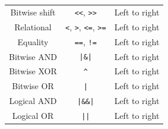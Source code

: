 \documentclass[a4paper]{report}
\begin{document}
\begin{table}[H]
\begin{tabular}{c c c}
        Bitwise shift                 & \texttt{<<}, \texttt{>>}                                                                                                                                                                                    & Left to right                  \\
        Relational                    & \texttt{<}, \texttt{>}, \texttt{<=}, \texttt{>=}                                                                                                                                              & Left to right                  \\
        Equality                      & \texttt{==}, \texttt{!=}                                                                                                                                                                                    & Left to right                  \\
        Bitwise AND                   & \texttt{|\&|}                                                                                                                                                                                     & Left to right                  \\
        Bitwise XOR                   & \texttt{^}                                                                                                                                                                                                         & Left to right                  \\
        Bitwise OR                    & \texttt{|}                                                                                                                                                                                                         & Left to right                  \\
        Logical AND                   & \texttt{|\&\&|}                                                                                                                                                                                   & Left to right                  \\
        Logical OR                    & \texttt{||}                                                                                                                                                                                                        & Left to right                  \\

\end{tabular}
\end{table}
\end{document}
